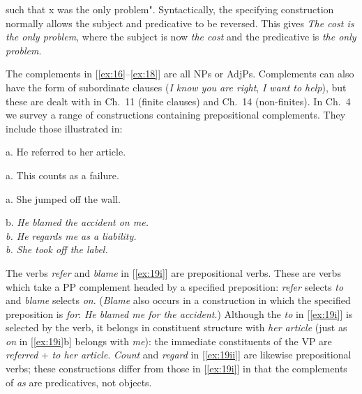\newpage\normalsize 

\noindent such that x was the only problem". Syntactically, the specifying construction normally allows the subject and predicative to be reversed. This gives \textit{The cost is the only problem}, where the subject is now \textit{the cost} and the predicative is \textit{the only problem}.

The complements in [\ref{ex:16}--\ref{ex:18}] are all NPs or AdjPs. Complements can also have the form of subordinate clauses (\textit{I know you are right}, \textit{I want to help}), but these are dealt with in Ch.~11 (finite clauses) and Ch.~14 (non-finites). In Ch.~4 we survey a range of constructions containing prepositional complements. They include those illustrated in:

\begin{examples}
\item \label{ex:19}
\noindent
\begin{minipage}[t]{0.5\linewidth}\vspace{-6pt}
    \begin{examples}[nosep]
        \item \label{ex:19i} \textnormal{a.} He referred to her article.
        \item \label{ex:19ii} \textnormal{a.} This counts as a failure.
        \item \label{ex:19iii} \textnormal{a.} She jumped off the wall.
    \end{examples}
\end{minipage}
\begin{minipage}[t]{0.5\linewidth}
    b. \itshape He blamed the accident on me.\\
    \textnormal{b.} He regards me as a liability.\\
    \textnormal{b.} She took off the label.
\end{minipage}\vspace{-6pt}
\end{examples}
The verbs \textit{refer} and \textit{blame} in [\ref{ex:19i}] are {prepositional verbs}. These are verbs which take a PP complement headed by a specified preposition: \textit{refer} selects \textit{to} and \textit{blame} selects \textit{on}. (\textit{Blame} also occurs in a construction in which the specified preposition is \textit{for}: \textit{He blamed me for the accident}.) Although the \textit{to} in [\ref{ex:19i}] is selected by the verb, it belongs in constituent structure with \textit{her article} (just as \textit{on} in [\ref{ex:19i}b] belongs with \textit{me}): the immediate constituents of the VP are \textit{referred} + \textit{to her article}. \textit{Count} and \textit{regard} in [\ref{ex:19ii}] are likewise prepositional verbs; these constructions differ from those in [\ref{ex:19i}] in that the complements of \textit{as} are predicatives, not objects. 

